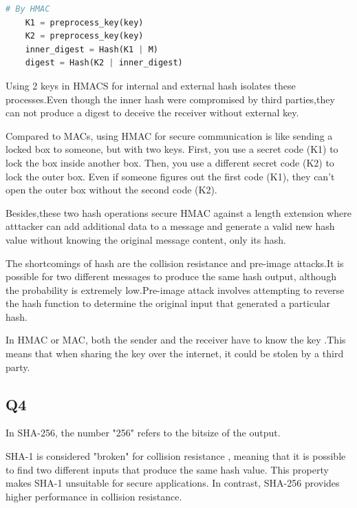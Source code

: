 \documentclass{article}
\begin{document}
	\begin{lstlisting}[language=Python]
	# By HMAC 
	K1 = preprocess_key(key)
	K2 = preprocess_key(key)
	inner_digest = Hash(K1 | M)
	digest = Hash(K2 | inner_digest)
	\end{lstlisting}

	Using 2 keys in HMACS for internal and external hash isolates these processes.Even though the inner hash were compromised by third parties,they can not produce a digest to deceive the receiver without external key.

	Compared to MACs, using HMAC for secure communication is like sending a locked box to someone, but with two keys. First, you use a secret code (K1) to lock the box inside another box. Then, you use a different secret code (K2) to lock the outer box. Even if someone figures out the first code (K1), they can't open the outer box without the second code (K2).

	Besides,these two hash operations secure HMAC against a length extension where atttacker can add additional data to a message and generate a valid new hash value without knowing the original message content, only its hash\cite{Length_extension_attack}.

	The shortcomings of hash are the collision resistance and pre-image attacks\cite{2-1-1.Hash(1)}.It is possible for two different messages to produce the same hash output, although the probability is extremely low.Pre-image attack involves attempting to reverse the hash function to determine the original input that generated a particular hash.

	In HMAC or MAC, both the sender and the receiver have to know the key .This means that when sharing the key over the internet, it could be stolen by a third party.


\subsection{Q4}

In SHA-256, the number "256" refers to the bitsize of the output\cite{SSLDragonSHA256}.

SHA-1 is considered "broken" for collision resistance \cite{2-1-1.Hash(1)}, meaning that it is possible to find two different inputs that produce the same hash value. This property makes SHA-1 unsuitable for secure applications. In contrast, SHA-256 provides higher performance in collision resistance.\\\\
\end{document}
